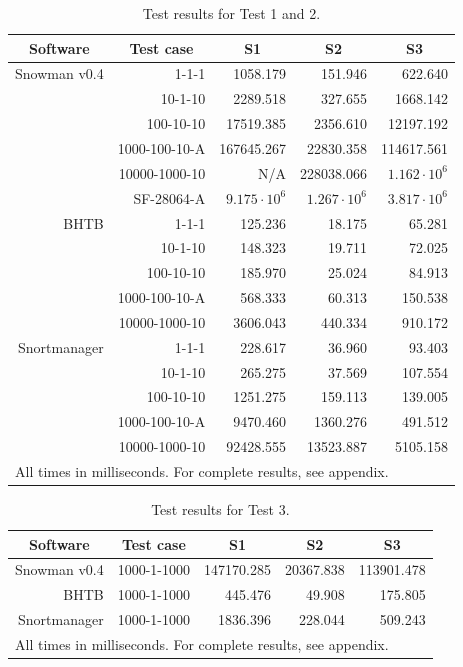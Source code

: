 \renewcommand{\arraystretch}{1.5}
\begin{table}[h]
  \centering
  \begin{tabular}{r|r|r|r|r}
  	\multicolumn{1}{c|}{Software} & \multicolumn{1}{c|}{Test case} &
  	\multicolumn{1}{c|}{S1} & \multicolumn{1}{c|}{S2} & \multicolumn{1}{c}{S3} \\
	\hline
	Snowman v0.4 & 1-1-1 & 1058.179 & 151.946 & 622.640 \\
	& 10-1-10 & 2289.518 & 327.655 & 1668.142 \\
	& 100-10-10 & 17519.385 & 2356.610 & 12197.192 \\
	& 1000-100-10-A & 167645.267 & 22830.358 & 114617.561 \\
	& 10000-1000-10 & N/A & 228038.066 & \(\mathrm{1.162 \cdot 10^6}\)\\
	& SF-28064-A & \(\mathrm{9.175 \cdot 10^6}\) & \(\mathrm{1.267 \cdot 10^6}\) &
	\(\mathrm{3.817 \cdot 10^6}\) \\
	\hline
	BHTB & 1-1-1 & 125.236 & 18.175 & 65.281 \\
	& 10-1-10 & 148.323 & 19.711 & 72.025 \\
	& 100-10-10 & 185.970 & 25.024 & 84.913 \\
	& 1000-100-10-A & 568.333 & 60.313 & 150.538 \\
	& 10000-1000-10 & 3606.043 & 440.334 & 910.172 \\
	\hline
	Snortmanager & 1-1-1 & 228.617 & 36.960 & 93.403 \\
	& 10-1-10 & 265.275 & 37.569 & 107.554 \\
	& 100-10-10 & 1251.275 & 159.113 & 139.005 \\
	& 1000-100-10-A & 9470.460 & 1360.276 & 491.512 \\
	& 10000-1000-10 & 92428.555 & 13523.887 & 5105.158 \\
	\hline
    \multicolumn{5}{l}{All times in milliseconds. For complete results, see
    appendix.}
  \end{tabular}
  \caption{Test results for Test 1 and 2.}
  \label{tab:test1Res}
\end{table}

\begin{table}[h]
  \centering
  \begin{tabular}{r|r|r|r|r}
  	\multicolumn{1}{c|}{Software} & \multicolumn{1}{c|}{Test case} &
  	\multicolumn{1}{c|}{S1} & \multicolumn{1}{c|}{S2} & \multicolumn{1}{c}{S3} \\
	\hline
	Snowman v0.4 & 1000-1-1000 & 147170.285 & 20367.838 & 113901.478 \\
	\hline
	BHTB & 1000-1-1000 & 445.476 & 49.908 & 175.805 \\
	\hline
	Snortmanager & 1000-1-1000 & 1836.396 & 228.044 & 509.243 \\
	\hline
    \multicolumn{5}{l}{All times in milliseconds. For complete results, see
    appendix.}
  \end{tabular}
  \caption{Test results for Test 3.}
  \label{tab:test3Res}
\end{table}

